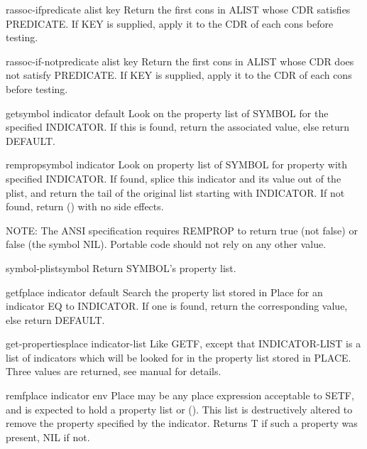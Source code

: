 \documentclass[10pt,english]{book}
\begin{document}
\begin{function}{rassoc-if}{predicate alist \key key}
  Return the first cons in ALIST whose CDR satisfies PREDICATE. If KEY
  is supplied, apply it to the CDR of each cons before testing.
\end{function}

\begin{function}{rassoc-if-not}{predicate alist \key key}
  Return the first cons in ALIST whose CDR does not satisfy PREDICATE.
  If KEY is supplied, apply it to the CDR of each cons before testing.
\end{function}

\begin{accessor}{get}{symbol indicator \op default}
  Look on the property list of SYMBOL for the specified INDICATOR. If this
  is found, return the associated value, else return DEFAULT.
\end{accessor}

\begin{function}{remprop}{symbol indicator}
  Look on property list of SYMBOL for property with specified
  INDICATOR. If found, splice this indicator and its value out of
  the plist, and return the tail of the original list starting with
  INDICATOR. If not found, return () with no side effects.

  NOTE: The ANSI specification requires REMPROP to return true (not false)
  or false (the symbol NIL). Portable code should not rely on any other value.
\end{function}

\begin{accessor}{symbol-plist}{symbol}
  Return SYMBOL's property list.
\end{accessor}

\begin{accessor}{getf}{place indicator \op default}
  Search the property list stored in Place for an indicator EQ to INDICATOR.
  If one is found, return the corresponding value, else return DEFAULT.
\end{accessor}

\begin{function}{get-properties}{place indicator-list}
  Like GETF, except that INDICATOR-LIST is a list of indicators which will
  be looked for in the property list stored in PLACE. Three values are
  returned, see manual for details.
\end{function}

\begin{macro}{remf}{place indicator \env env}
  Place may be any place expression acceptable to SETF, and is expected
  to hold a property list or (). This list is destructively altered to
  remove the property specified by the indicator. Returns T if such a
  property was present, NIL if not.
\end{macro}
\end{document}
